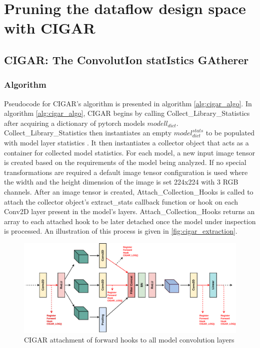 \section{Pruning the dataflow design space with CIGAR}
\label{chap:dda:dataflow_dse:pruning}

\subsection{CIGAR: The ConvolutIon statIstics GAtherer}
\label{chap:dda:dataflow_dse:pruning:cigar}

\subsubsection{Algorithm}
\label{chap:dda:dataflow_dse:pruning:cigar:algo}

Pseudocode for \ac{CIGAR}'s algorithm is presented in algorithm
\ref{alg:cigar_algo}. In algorithm \ref{alg:cigar_algo}, \ac{CIGAR} begins by
calling Collect\_Library\_Statistics after acquiring a dictionary of pytorch
models $modell_{dict}$. Collect\_Library\_Statistics then instantiates an empty
$model^{stats}_{dict}$ to be populated with model layer statistics . It then
instantiates a collector object that acts as a container for collected model
statistics. For each model, a new input image tensor is created based on the
requirements of the model being analyzed. If no special transformations are
required a default image tensor configuration is used where the width and the
height dimension of the image is set 224x224 with 3 RGB channels. After an image
tensor is created, Attach\_Collection\_Hooks is called to attach the collector
object's extract\_stats callback function or hook on each Conv2D layer present
in the model's layers. Attach\_Collection\_Hooks returns an array to each
attached hook to be later detached once the model under inspection is processed.
An illustration of this process is given in \autoref{fig:cigar_extraction}.

\begin{figure}
    \centering
    \includegraphics[scale=0.5]{fig/CIGAR.pdf}
    \caption{\ac{CIGAR} attachment of forward hooks to all model convolution layers}
    \label{fig:cigar_extraction}
\end{figure}

